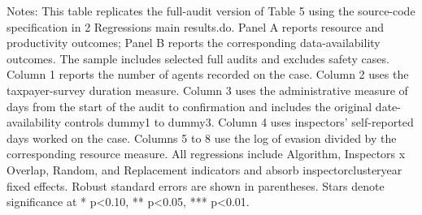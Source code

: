 \begin{table}[H]\centering
\begin{threeparttable}
\caption{Table 5: Resources Allocated to Audits and Audit Productivity, Full Audits}
\label{tab:table5_fullaudits_replicated}

\footnotesize


\begin{tablenotes}[flushleft]
\footnotesize
\item Notes: This table replicates the full-audit version of Table 5 using the source-code specification in 2 Regressions main results.do. Panel A reports resource and productivity outcomes; Panel B reports the corresponding data-availability outcomes. The sample includes selected full audits and excludes safety cases. Column 1 reports the number of agents recorded on the case. Column 2 uses the taxpayer-survey duration measure. Column 3 uses the administrative measure of days from the start of the audit to confirmation and includes the original date-availability controls dummy1 to dummy3. Column 4 uses inspectors' self-reported days worked on the case. Columns 5 to 8 use the log of evasion divided by the corresponding resource measure. All regressions include Algorithm, Inspectors x Overlap, Random, and Replacement indicators and absorb inspectorclusteryear fixed effects. Robust standard errors are shown in parentheses. Stars denote significance at * p<0.10, ** p<0.05, *** p<0.01.
\end{tablenotes}
\end{threeparttable}
\end{table}
